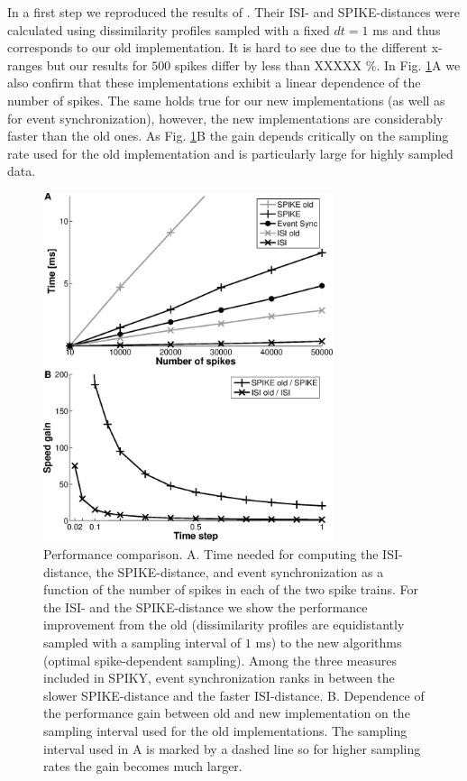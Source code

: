 \documentclass[10pt,twocolumn]{elsart5p}
\begin{document}
In a first step we reproduced the results of \cite{Rusu14}. Their ISI- and SPIKE-distances were calculated using dissimilarity profiles sampled with a fixed $dt = 1$ ms and thus corresponds to our old implementation. It is hard to see due to the different x-ranges but our results for $500$ spikes differ by less than XXXXX \%. In Fig. \ref{fig:Fig5-Performance-Comparison}A we also confirm that these implementations exhibit a linear dependence of the number of spikes. The same holds true for our new implementations (as well as for event synchronization), however, the new implementations are considerably faster than the old ones. As Fig. \ref{fig:Fig5-Performance-Comparison}B the gain depends critically on the sampling rate used for the old implementation and is particularly large for highly sampled data.
%
%
\begin{figure}
    \includegraphics[width=85mm]{Performance_Comparison.eps}
    \caption{\abb\label{fig:Fig5-Performance-Comparison} Performance comparison.   A. Time needed for computing the ISI-distance, the SPIKE-distance, and event synchronization as a function of the number of spikes in each of the two spike trains. For the ISI- and the SPIKE-distance we show the performance improvement from the old (dissimilarity profiles are equidistantly sampled with a sampling interval of $1$ ms) to the new algorithms (optimal spike-dependent sampling). Among the three measures included in SPIKY, event synchronization ranks in between the slower SPIKE-distance and the faster ISI-distance.   B. Dependence of the performance gain between old and new implementation on the sampling interval used for the old implementations. The sampling interval used in A is marked by a dashed line so for higher sampling rates the gain becomes much larger.}
\end{figure}
\end{document}
